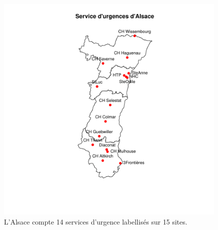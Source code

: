 \documentclass[12pt,english,french,twoside]{report}\usepackage[]{graphicx}\usepackage[]{color}
\makeatletter
\def\maxwidth{ %
  \ifdim\Gin@nat@width>\linewidth
    \linewidth
  \else
    \Gin@nat@width
  \fi
}
\newenvironment{knitrout}{}{} %
\makeatother
\begin{document}
\begin{figure}[ht]
 \centering
\begin{knitrout}
\color{fgcolor}
\includegraphics[width=\maxwidth]{figure/carte_sau_2} 

\end{knitrout}

 \caption[Services d'urgenced'Alsace]{L'Alsace compte 14 services d'urgence labellisés sur 15 sites.}
 \label{fig:su_alsace}
\end{figure}
\end{document}
